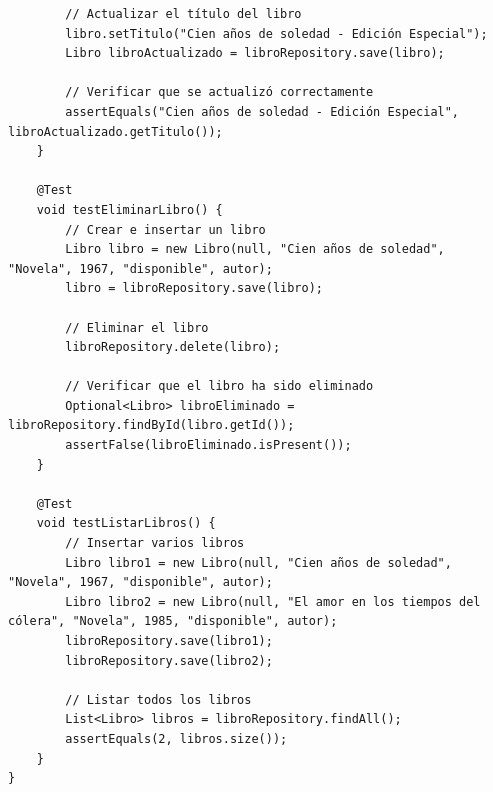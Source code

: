 \documentclass[11pt]{article}
\begin{document}
\begin{verbatim}
        // Actualizar el título del libro
        libro.setTitulo("Cien años de soledad - Edición Especial");
        Libro libroActualizado = libroRepository.save(libro);

        // Verificar que se actualizó correctamente
        assertEquals("Cien años de soledad - Edición Especial", libroActualizado.getTitulo());
    }

    @Test
    void testEliminarLibro() {
        // Crear e insertar un libro
        Libro libro = new Libro(null, "Cien años de soledad", "Novela", 1967, "disponible", autor);
        libro = libroRepository.save(libro);

        // Eliminar el libro
        libroRepository.delete(libro);

        // Verificar que el libro ha sido eliminado
        Optional<Libro> libroEliminado = libroRepository.findById(libro.getId());
        assertFalse(libroEliminado.isPresent());
    }

    @Test
    void testListarLibros() {
        // Insertar varios libros
        Libro libro1 = new Libro(null, "Cien años de soledad", "Novela", 1967, "disponible", autor);
        Libro libro2 = new Libro(null, "El amor en los tiempos del cólera", "Novela", 1985, "disponible", autor);
        libroRepository.save(libro1);
        libroRepository.save(libro2);

        // Listar todos los libros
        List<Libro> libros = libroRepository.findAll();
        assertEquals(2, libros.size());
    }
}
\end{verbatim}
\end{document}
